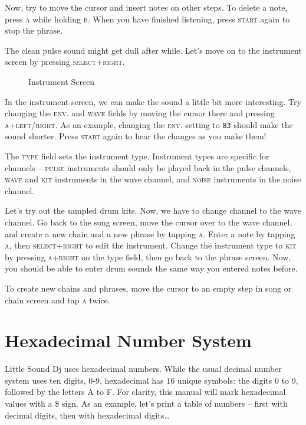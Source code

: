Now, try to move the cursor and insert notes on other steps.
To delete a note, press \textsc{a} while holding \textsc{b}.
When you have finished listening, press \textsc{start} again to stop the phrase.

The clean pulse sound might get dull after while. Let's move on to the instrument
screen by pressing \textsc{select+right}.

\begin{figure}[hbtp]
\centering
{}
\caption{Instrument Screen}
\label{fig:instr}
\end{figure}

In the instrument screen, we can make the sound a little bit more interesting.
Try changing the \textsc{env.} and \textsc{wave} fields by moving the cursor there and pressing \textsc{a+left/right}.
As an example, changing the \textsc{env.} setting to \texttt{83} should make the sound shorter.
Press \textsc{start} again to hear the changes as you make them!

The \textsc{type} field sets the instrument type. Instrument types are specific for
channels -- \textsc{pulse} instruments should only be played back in the pulse channels, \textsc{wave} and \textsc{kit}
instruments in the wave channel, and \textsc{noise} instruments in the noise channel.

Let's try out the sampled drum kits. Now, we have to change channel to the wave channel.
Go back to the song screen, move the cursor over to the wave channel, and create a new
chain and a new phrase by tapping \textsc{a}.
Enter a note by tapping \textsc{a}, then \textsc{select+right} to edit the instrument.
Change the instrument type to \textsc{kit} by pressing \textsc{a+right} on the type field,
then go back to the phrase screen. Now, you should be able to enter drum sounds the same way
you entered notes before.

To create new chains and phrases, move the cursor to an empty step in song or chain screen and tap \textsc{a} twice.

\section{Hexadecimal Number System}

Little Sound Dj uses hexadecimal numbers. While the usual decimal number system uses ten digits, 0-9, hexadecimal has 16 unique symbols: the digits 0 to 9, followed by the letters A to F. For clarity, this manual will mark hexadecimal values with a \$ sign.
As an example, let's print a table of numbers -- first with decimal digits, then with
hexadecimal digits\ldots

